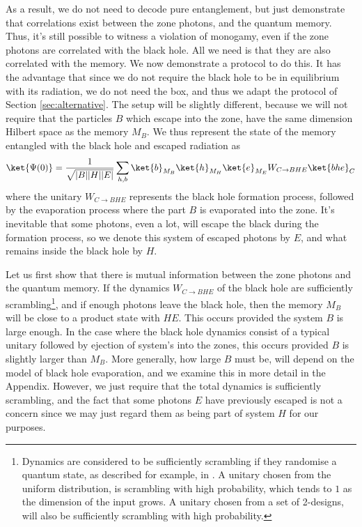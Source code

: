 \documentclass[12pt,a4paper]{article}
\begin{document}
As a result, we do not need to decode pure entanglement, but just demonstrate that correlations exist between the zone photons, and the quantum memory. Thus, it's still possible to witness a violation of monogamy, even if the zone photons are correlated with the black hole. All we need is that they are also correlated with the memory.
%
We now demonstrate a protocol to do this. It has the advantage that since we do not require the black hole to be in equilibrium with its radiation, we 
do not need the box, and thus we adapt the protocol of Section \ref{sec:alternative}.
The setup will be slightly different, because we will not require that the particles $B$ which escape into the zone, have the same dimension Hilbert space as the memory $M_B$. We thus represent the state of the memory entangled with the black hole and escaped radiation as
\begin{align}
\ket{\Psi(0)}=\frac{1}{\sqrt{|B||H||E|}}
\sum_{h,b}\ket{b}_{M_B}\ket{h}_{M_H}\ket{e}_{M_E} W_{C\rightarrow BHE} \ket{bhe}_{C}
\end{align}
where the unitary $W_{C\rightarrow BHE}$ represents the black hole formation process, followed by the evaporation process where the part $B$ is evaporated into the zone.
It's inevitable that some photons, even a lot, will escape the black during the formation process, so we  
denote this  system of escaped photons by $E$, and what remains inside the black hole by $H$. 

Let us first show that there is mutual information between the zone photons and the quantum memory. If the dynamics $W_{C\rightarrow BHE}$  of the black hole are sufficiently  scrambling\footnote{Dynamics are considered to be sufficiently scrambling if they randomise a quantum state, as described for example, in \cite{randomization}. A unitary chosen from the uniform distribution, is scrambling with high probability, which tends to $1$ as the dimension of the input grows. A unitary chosen from a set of 2-designs\cite{dankert2006exact}, will also be sufficiently scrambling with high probability.}, 
and if enough photons leave the black hole, then the memory $M_B$ will be close to a product state with $HE$. This occurs provided the system $B$ is large enough\cite{FQSW,HaydenPreskill,dupuis2010one}. In the case where the black hole dynamics consist of a typical unitary followed by ejection of system's into the zones\cite{bhlock,HaydenPreskill,sekino2008fast}, this occurs provided $B$ is slightly larger than $M_B$. More generally, how large $B$ must be, will depend on the model of black hole evaporation, and we examine this in more detail in the Appendix. However, we just require that the total dynamics is sufficiently scrambling, and the fact that some photons $E$ have previously escaped  is not a concern since we may just regard them as being part of system $H$ for our purposes.
\end{document}
